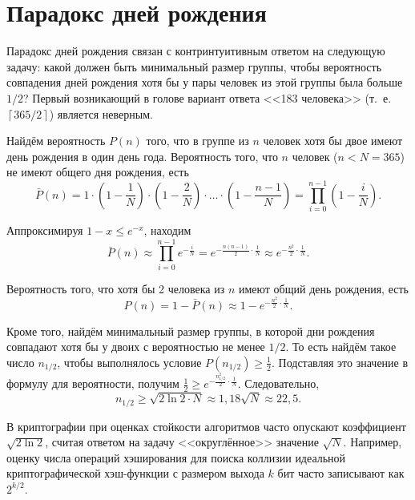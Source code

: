 \section{Парадокс дней рождения}\label{section-birthday-padradox}

Парадокс дней рождения связан с контринтуитивным ответом на следующую задачу: какой должен быть минимальный размер группы, чтобы вероятность совпадения дней рождения хотя бы у пары человек из этой группы была больше $1 / 2$? Первый возникающий в голове вариант ответа <<183 человека>> (т.~е. $\left\lceil 365 / 2 \right\rceil$) является неверным.

Найдём вероятность $P(n)$ того, что в группе из $n$ человек хотя бы двое имеют день рождения в один день года. Вероятность того, что $n$ человек ($n < N = 365$) не имеют общего дня рождения, есть
\[
    \bar{P}(n) = 1 \cdot \left( 1 - \frac{1}{N} \right) \cdot \left(1 - \frac{2}{N} \right)\cdot \dots \cdot  \left( 1 - \frac{n-1}{N} \right) = \prod\limits_{i=0}^{n-1} \left( 1 - \frac{i}{N} \right).
\]

Аппроксимируя $1-x \leq e^{-x}$, находим
    \[ \bar{P}(n) \approx \prod\limits_{i=0}^{n-1} e^{-\frac{i}{N}} = e^{-\frac{n(n-1)}{2} \cdot \frac{1}{N}} \approx e^{-\frac{n^2}{2} \cdot \frac{1}{N}}. \]

Вероятность того, что хотя бы 2 человека из $n$ имеют общий день рождения, есть
    \[ P(n) = 1 - \bar{P}(n) \approx 1 -  e^{-\frac{n^2}{2} \cdot \frac{1}{N}}. \]

Кроме того, найдём минимальный размер группы, в которой дни рождения совпадают хотя бы у двоих с вероятностью не менее $1 / 2$. То есть найдём такое число $n_{1/2}$, чтобы выполнялось условие $P(n_{1/2}) \geq \frac{1}{2}$. Подставляя это значение в формулу для вероятности, получим $\frac{1}{2} \geq e^{-\frac{n_{1/2}^2}{2} \cdot \frac{1}{N}}$. Следовательно,
	\[n_{1/2} \geq \sqrt{2 \ln 2 \cdot N} \approx 1,18 \sqrt{ N } \approx 22,5.\]

В криптографии при оценках стойкости алгоритмов часто опускают коэффициент $\sqrt{2 \ln 2}$, считая ответом на задачу <<округлённое>> значение $\sqrt{ N }$. Например, оценку числа операций хэширования для поиска коллизии идеальной криптографической хэш-функции с размером выхода $k$ бит часто записывают как $2^{k/2}$.
